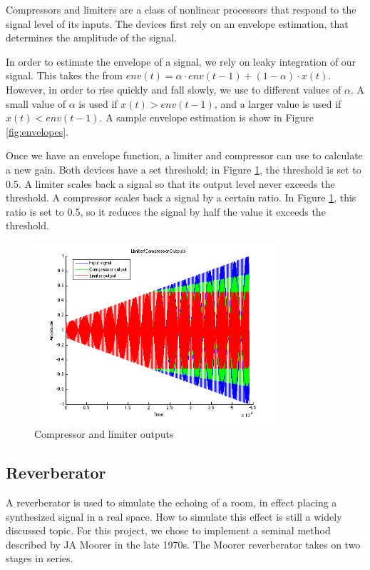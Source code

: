\documentclass[letterpaper,12pt]{article}
\begin{document}
Compressors and limiters are a class of nonlinear processors that respond to the signal level of its inputs. The devices first rely on an envelope estimation, that determines the amplitude of the signal.

In order to estimate the envelope of a signal, we rely on leaky integration of our signal. This takes the from $env(t) = \alpha \cdot env(t-1) + (1-\alpha) \cdot x(t)$. However, in order to rise quickly and fall slowly, we use to different values of $\alpha$. A small value of $\alpha$ is used if $x(t) > env(t-1)$, and a larger value is used if $x(t) < env(t-1)$. A sample envelope estimation is show in Figure \ref{fig:envelopes}.

Once we have an envelope function, a limiter and compressor can use to calculate a new gain. Both devices have a set threshold; in Figure \ref{fig:compressor-limiter}, the threshold is set to 0.5. A limiter scales back a signal so that its output level never exceeds the threshold. A compressor scales back a signal by a certain ratio. In Figure \ref{fig:compressor-limiter}, this ratio is set to 0.5, so it reduces the signal by half the value it exceeds the threshold.

\begin{figure}[h]
\centering
\includegraphics[width=0.8\textwidth]{figures/limiter-compressor-output.png}
\caption{Compressor and limiter outputs}
\label{fig:compressor-limiter}
\end{figure}


\subsection{Reverberator}

A reverberator is used to simulate the echoing of a room, in effect placing a synthesized signal in a real space. How to simulate this effect is still a widely discussed topic. For this project, we chose to implement a seminal method described by JA Moorer in the late 1970s\cite{moorer}. The Moorer reverberator takes on two stages in series.
\end{document}
